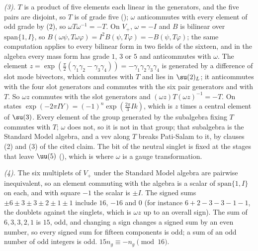 \emph{(3).} $T$ is a product of five elements each linear in the generators, and the five pairs are disjoint, so $T$ is of grade five (); $\omega$ anticommutes with every element of odd grade by (2), so $\omega T\omega^{-1} = -T$. On $V_{+}$, $\omega = -I$ and $B$ is bilinear over $\mathrm{span}\{1, I\}$, so $B(\omega\psi, T\omega\varphi) = I^{2}B(\psi, T\varphi) = -B(\psi, T\varphi)$; the same computation applies to every bilinear form in two fields of the sixteen, and in the algebra every mass form has grade $1$, $3$ or $5$ and anticommutes with $\omega$. The element $z = \exp(\tfrac{\pi}{2}(\gamma_{1}\gamma_{2} - \gamma_{3}\gamma_{4})) = -\gamma_{1}\gamma_{2}\gamma_{3}\gamma_{4}$ is generated by a difference of slot mode bivectors, which commutes with $T$ and lies in $\su(2)_{L}$; it anticommutes with the four slot generators and commutes with the six pair generators and with $T$. So $\omega z$ commutes with the slot generators and $(\omega z)T(\omega z)^{-1} = -T$. On states $\exp(-2\pi IY) = (-1)^{n}\exp(\tfrac{2\pi}{3}Ik)$, which is $z$ times a central element of $\su(3)$. Every element of the group generated by the subalgebra fixing $T$ commutes with $T$; $\omega$ does not, so it is not in that group; that subalgebra is the Standard Model algebra, and a vev along $T$ breaks Pati-Salam to it, by clauses (2) and (3) of the cited claim. The bit of the neutral singlet is fixed at the stages that leave $\uu(5)$ (), which is where $\omega$ is a gauge transformation.

\emph{(4).} The six multiplets of $V_{+}$ under the Standard Model algebra are pairwise inequivalent, so an element commuting with the algebra is a scalar of $\mathrm{span}\{1, I\}$ on each, and with square $-1$ the scalar is $\pm I$. The signed sums $\pm 6 \pm 3 \pm 3 \pm 2 \pm 1 \pm 1$ include $16$, $-16$ and $0$ (for instance $6 + 2 - 3 - 3 - 1 - 1$, the doublets against the singlets, which is $\omega z$ up to an overall sign). The sum of $6, 3, 3, 2, 1$ is $15$, odd, and changing a sign changes a signed sum by an even number, so every signed sum for fifteen components is odd; a sum of an odd number of odd integers is odd. $15n_{g} \equiv -n_{g} \pmod{16}$.

